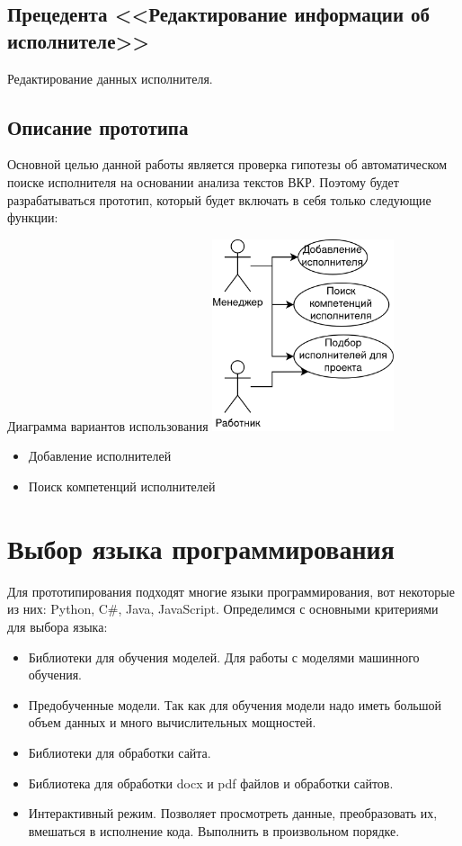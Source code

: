 \documentclass[PI,KR]{HSEUniversity}
\begin{document}
\subsection{Прецедента <<Редактирование информации об исполнителе>>}
Редактирование данных исполнителя.
\subsection{Описание прототипа}
Основной целью данной работы является проверка гипотезы об автоматическом поиске исполнителя на основании анализа текстов ВКР. Поэтому будет разрабатываться прототип, который будет включать в себя только следующие функции:
\begin{FIGURE}[h]{Диаграмма вариантов использования \label{fig:figure3}}
	\includegraphics[width=0.4\textwidth]{img/Диаграмма вариантов использования прототипа}
\end{FIGURE}
\begin{itemize}
	\item Добавление исполнителей
	\item Поиск компетенций исполнителей
\end{itemize}
\section{Выбор языка программирования}
Для прототипирования подходят многие языки программирования, вот некоторые из них: Python, C\#, Java, JavaScript. Определимся с основными критериями для выбора языка:

\begin{itemize}
	\item Библиотеки для обучения моделей. Для работы с моделями машинного обучения.
	\item Предобученные модели. Так как для обучения модели надо иметь большой объем данных и много вычислительных мощностей.
	\item Библиотеки для обработки сайта.
	\item Библиотека для обработки docx и pdf файлов и обработки сайтов.
	\item Интерактивный режим. Позволяет просмотреть данные, преобразовать их, вмешаться в исполнение кода. Выполнить в произвольном порядке.
\end{itemize} 
\end{document}
